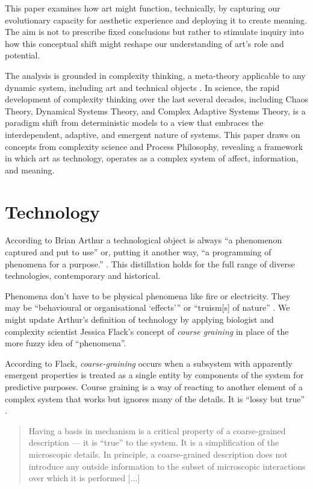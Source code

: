 \documentclass[letterpaper]{article}
\begin{document}
    This paper examines how art might function, technically, by capturing our evolutionary capacity for aesthetic experience and deploying it to create meaning. The aim is not to prescribe fixed conclusions but rather to stimulate inquiry into how this conceptual shift might reshape our understanding of art's role and potential.

    The analysis is grounded in complexity thinking, a meta-theory applicable to any dynamic system, including art and technical objects \citep{CilliersRichardsonCmplxtyScnc2001}. In science, the rapid development of complexity thinking over the last several decades, including Chaos Theory, Dynamical Systems Theory, and Complex Adaptive Systems Theory, is a paradigm shift from deterministic models to a view that embraces the interdependent, adaptive, and emergent nature of systems. This paper draws on concepts from complexity science and Process Philosophy, revealing a framework in which art as technology, operates as a complex system of affect, information, and meaning.
    
\section{Technology}

    According to Brian Arthur a technological object is always “a phenomenon captured and put to use” \citep[p.53]{theNatureOfTechnology2009} or, putting it another way, “a programming of phenomena for a purpose.” \citep[p.53]{theNatureOfTechnology2009}. This distillation holds for the full range of diverse technologies, contemporary and historical.

    Phenomena don't have to be physical phenomena like fire or electricity. They may be “behavioural or organisational ‘effects’” \citep[p.55]{theNatureOfTechnology2009} or “truism[s] of nature” \citep[p.45]{theNatureOfTechnology2009}. We might update Arthur's definition of technology by applying biologist and complexity scientist Jessica Flack's concept of \emph{course graining} in place of the more fuzzy idea of “phenomena”. 

    According to Flack, \emph{coarse-graining} occurs when a subsystem with apparently emergent properties is treated as a single entity by components of the system for predictive purposes. Course graining is a way of reacting to another element of a complex system that works but ignores many of the details. It is “lossy but true” \citep[p.4]{FlackCrsGrnng2017}.

    \begin{quote}
        Having a basis in mechanism is a critical property of a coarse-grained description — it is “true” to the system. It is a simplification of the microscopic details. In principle, a coarse-grained description does not introduce any outside information to the subset of microscopic interactions over which it is performed [...] \citep[p.4]{FlackCrsGrnng2017}
    \end{quote}
\end{document}
